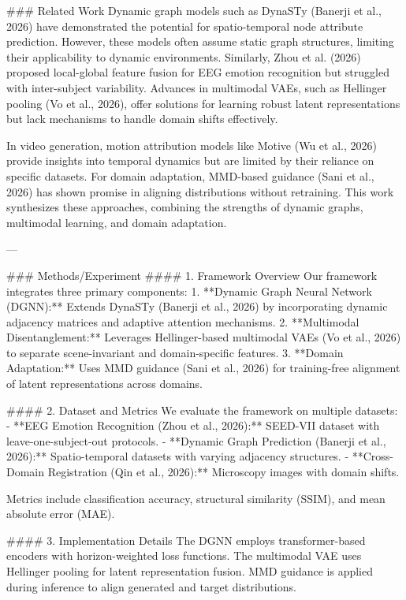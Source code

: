 ### Related Work  
Dynamic graph models such as DynaSTy (Banerji et al., 2026) have demonstrated the potential for spatio-temporal node attribute prediction. However, these models often assume static graph structures, limiting their applicability to dynamic environments. Similarly, Zhou et al. (2026) proposed local-global feature fusion for EEG emotion recognition but struggled with inter-subject variability. Advances in multimodal VAEs, such as Hellinger pooling (Vo et al., 2026), offer solutions for learning robust latent representations but lack mechanisms to handle domain shifts effectively.

In video generation, motion attribution models like Motive (Wu et al., 2026) provide insights into temporal dynamics but are limited by their reliance on specific datasets. For domain adaptation, MMD-based guidance (Sani et al., 2026) has shown promise in aligning distributions without retraining. This work synthesizes these approaches, combining the strengths of dynamic graphs, multimodal learning, and domain adaptation.

---

### Methods/Experiment  
#### 1. Framework Overview  
Our framework integrates three primary components:  
1. **Dynamic Graph Neural Network (DGNN):** Extends DynaSTy (Banerji et al., 2026) by incorporating dynamic adjacency matrices and adaptive attention mechanisms.  
2. **Multimodal Disentanglement:** Leverages Hellinger-based multimodal VAEs (Vo et al., 2026) to separate scene-invariant and domain-specific features.  
3. **Domain Adaptation:** Uses MMD guidance (Sani et al., 2026) for training-free alignment of latent representations across domains.

#### 2. Dataset and Metrics  
We evaluate the framework on multiple datasets:  
- **EEG Emotion Recognition (Zhou et al., 2026):** SEED-VII dataset with leave-one-subject-out protocols.  
- **Dynamic Graph Prediction (Banerji et al., 2026):** Spatio-temporal datasets with varying adjacency structures.  
- **Cross-Domain Registration (Qin et al., 2026):** Microscopy images with domain shifts.

Metrics include classification accuracy, structural similarity (SSIM), and mean absolute error (MAE).

#### 3. Implementation Details  
The DGNN employs transformer-based encoders with horizon-weighted loss functions. The multimodal VAE uses Hellinger pooling for latent representation fusion. MMD guidance is applied during inference to align generated and target distributions.

